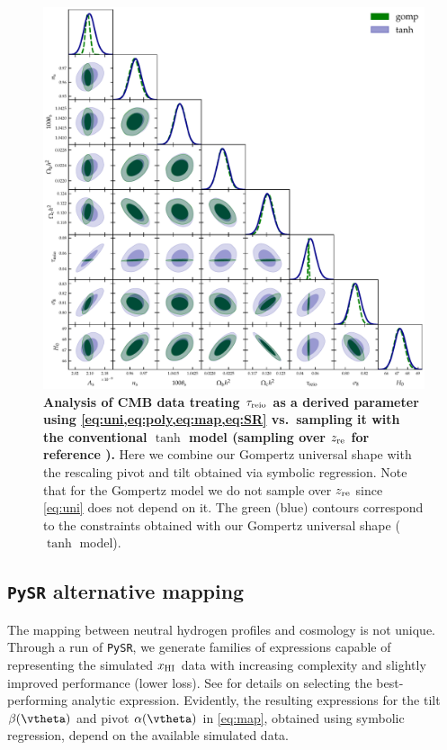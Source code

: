 \begin{figure}[tb]
\centering
\includegraphics[width=\linewidth]{figs/gomp_tanh_triangle_kill_full.pdf}
\caption{\textbf{Analysis of CMB data treating $\tau_{\mathrm{reio}}$ as a derived
parameter using \cref{eq:uni,eq:poly,eq:map,eq:SR} vs.\ sampling it with
the conventional $\tanh$ model (sampling over $z_{\mathrm{re}}$ for reference
).}
Here we combine our Gompertz universal shape with the rescaling pivot
and tilt obtained via symbolic regression.
Note that for the Gompertz model we do not sample over $z_{\mathrm{re}}$ since
\cref{eq:uni} does not depend on it.
The green (blue) contours correspond to the constraints obtained with
our Gompertz universal shape ($\tanh$ model).}
\label{fig:unleashed_gomp}
\end{figure}


\subsection*{\texttt{PySR} alternative mapping}
\label{ssec:0226}

The mapping between neutral hydrogen profiles and cosmology is not
unique.
Through a run of \texttt{PySR}, we generate families of expressions
capable of representing the simulated $x_{\mathrm{HI}}$ data with increasing
complexity and slightly improved performance (lower loss).
See  for details on selecting the best-performing
analytic expression.
Evidently, the resulting expressions for the tilt $\tilt(\vtheta)$ and
pivot $\ap(\vtheta)$ in \cref{eq:map}, obtained using symbolic
regression, depend on the available simulated data.

